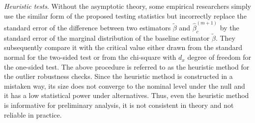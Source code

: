 \documentclass[11pt, letterpaper]{article}
\numberwithin{algorithm}{section}
\numberwithin{assumption}{section}
\numberwithin{lemma}{section}
\numberwithin{theorem}{section}
\numberwithin{corollary}{section}
\numberwithin{remark}{section}
\numberwithin{equation}{section}
\numberwithin{figure}{section}
\numberwithin{table}{section}
\begin{document}

\emph{Heuristic tests}. Without the asymptotic theory, some empirical researchers simply use the similar form of the proposed testing statistics but incorrectly replace the standard error of the difference between two estimators $\widetilde{\beta}$ and $\widehat{\beta}_{c}^{(m + 1)}$ by the standard error of the marginal distribution of the baseline estimator $\widetilde{\beta}$. They subsequently compare it with the critical value either drawn from the standard normal for the two-sided test or from the chi-square with $d_{x}$ degree of freedom for the one-sided test. The above procedure is referred to as the heuristic method for the outlier robustness checks. Since the heuristic method is constructed in a mistaken way, its size does not converge to the nominal level under the null and it has a low statistical power under alternatives. Thus, even the heuristic method is informative for preliminary analysis, it is not consistent in theory and not reliable in practice.
\end{document}
